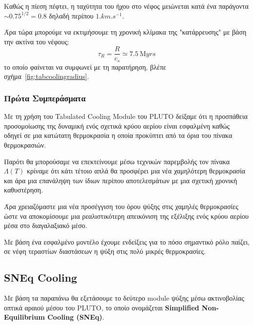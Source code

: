 	Καθώς η πίεση πέφτει, η ταχύτητα του ήχου στο νέφος μειώνεται κατά ένα παράγοντα $\sim 0.75^{1/2}=0.8$ δηλαδή περίπου $1\si{.km.s^{-1}}$.
	
%	
	Άρα τώρα μπορούμε να εκτιμήσουμε τη χρονική κλίμακα της "κατάρρευσης" με βάση την ακτίνα του νέφους:
	\begin{equation}
	\tau_R=\frac{R}{c_s} \simeq \SI{7.5}{\mega yrs}
	\end{equation}
	το οποίο φαίνεται να συμφωνεί με τη παρατήρηση, βλέπε σχήμα~\ref{fig:tabcoolingradius}.
	
	\subsubsection{Πρώτα Συμπεράσματα}
	Με τη χρήση του Tabulated Cooling Module του PLUTO δείξαμε ότι η προσπάθεια προσομοίωσης της δυναμική ενός σχετικά κρύου αερίου είναι εσφαλμένη καθώς οδηγεί σε μια κατώτατη θερμοκρασία η οποία προκύπτει από τα όρια του πίνακα θερμοκρασιών.
	
	Παρότι θα μπορούσαμε να επεκτείνουμε μέσω τεχνικών παρεμβολής τον πίνακα  $\Lambda (T)$ κρίναμε ότι κάτι τέτοιο απλά θα προσφέρει μια νέα χαμηλότερη θερμοκρασία και άρα μια επανάληψη των ίδιων περίπου αποτελεσμάτων με μια σχετική χρονική καθυστέρηση. 
	
	Άρα χρειαζόμαστε μια νέα προσέγγιση του όρου ψύξης στις χαμηλές θερμοκρασίες ώστε να αποκομίσουμε μια ρεαλιστικότερη απεικόνιση της εξέλιξης ενός κρύου αερίου μέσα στο διαγαλαξιακό μέσο.  
	
	Με βάση ένα εσφαλμένο μοντέλο έχουμε ενδείξεις για το πόσο σημαντικό ρόλο παίζει, σε νέφη τεραστίων διαστάσεων η ψύξη στις πολύ μικρές θερμοκρασίες. 
	
	\subsection{SNEq Cooling}
	Με βάση τα παραπάνω θα εξετάσουμε το δεύτερο module ψύξης μέσω ακτινοβολίας οπτικά αραιού μέσου του PLUTO, το οποίο ονομάζεται \textbf{Simplified Non-Equilibrium Cooling (SNEq)}. 
	
